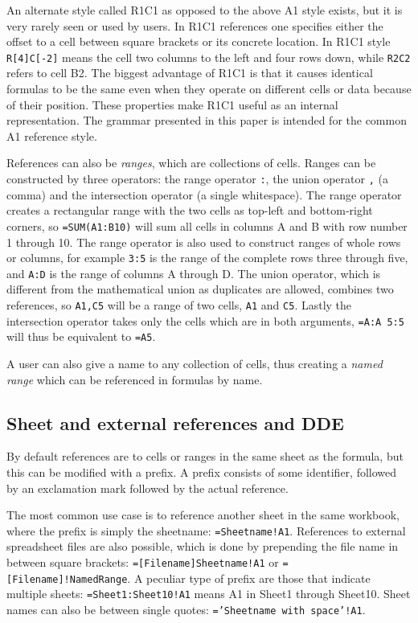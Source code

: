 \documentclass[conference]{IEEEtran}
\begin{document}
An alternate style called R1C1 as opposed to the above A1 style exists, but it is very rarely seen or used by users.
In R1C1 references one specifies either the offset to a cell between square brackets or its concrete location.
In R1C1 style \texttt{R[4]C[-2]} means the cell two columns to the left and four rows down, while \texttt{R2C2} refers to cell B2.
The biggest advantage of R1C1 is that it causes identical formulas to be the same even when they operate on different cells or data because of their position.
These properties make R1C1 useful as an internal representation. The grammar presented in this paper is intended for the common A1 reference style.

References can also be \emph{ranges}, which are collections of cells.
Ranges can be constructed by three operators: the range operator \texttt{:}, the union operator \texttt{,} (a comma) and the intersection operator \texttt{} (a single whitespace).
The range operator creates a rectangular range with the two cells as top-left and bottom-right corners, so \texttt{=SUM(A1:B10)} will sum all cells in columns A and B with row number 1 through 10.
The range operator is also used to construct ranges of whole rows or columns, for example \texttt{3:5} is the range of the complete rows three through five, and \texttt{A:D} is the range of columns A through D.
The union operator, which is different from the mathematical union as duplicates are allowed, combines two references, so \texttt{A1,C5} will be a range of two cells, \texttt{A1} and \texttt{C5}.
Lastly the intersection operator takes only the cells which are in both arguments, \texttt{=A:A 5:5} will thus be equivalent to \texttt{=A5}.

A user can also give a name to any collection of cells, thus creating a \emph{named range} which can be referenced in formulas by name.

\subsection{Sheet and external references and DDE}
\label{subsection:ExternalRefsDDE}

By default references are to cells or ranges in the same sheet as the formula, but this can be modified with a prefix. A prefix consists of some identifier, followed by an exclamation mark followed by the actual reference.

The most common use case is to reference another sheet in the same workbook, where the prefix is simply the sheetname: \texttt{=Sheetname!A1}. References to external spreadsheet files are also possible, which is done by prepending the file name in between square brackets: \texttt{=[Filename]Sheetname!A1} or \texttt{=[Filename]!NamedRange}.
A peculiar type of prefix are those that indicate multiple sheets: \texttt{=Sheet1:Sheet10!A1} means A1 in Sheet1 through Sheet10.
Sheet names can also be between single quotes: \texttt{='Sheetname with space'!A1}. 
\end{document}

